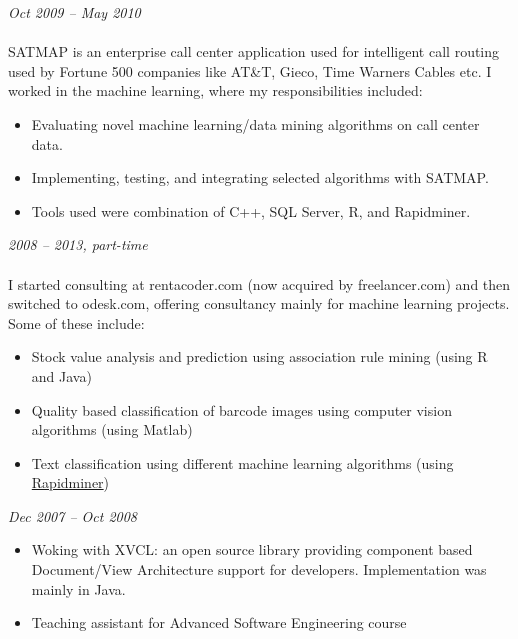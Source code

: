 \documentclass[margin, 10pt]{res} %
\begin{document}
\begin{resume}
{\sl {}} \hfill \textit{Oct 2009 -- May 2010} \\
{\href{http://www.satmapinc.com/}{\color{RubineRed}{SATMAP Inc, Machine Learning Team, Pakistan}}}  \\
SATMAP is an enterprise call center application used for intelligent call routing used by Fortune 500 companies like AT\&T, Gieco, Time Warners Cables etc. I worked in the machine learning, where my responsibilities included:

\begin{itemize} \itemsep -2pt %
\item Evaluating novel machine learning/data mining algorithms on call center data. 
\item Implementing, testing, and integrating selected algorithms with SATMAP. 
\item Tools used were combination of C++, SQL Server, R, and Rapidminer.
\end{itemize}

{\sl \textbf{}} \hfill \textit{2008 -- 2013, part-time} \\
{\color{RubineRed}{Upwork (formerly Odesk)} } \\
I started consulting at rentacoder.com (now acquired by freelancer.com) and then switched to odesk.com, offering consultancy mainly for machine learning projects. Some of these include: 
\begin{itemize} \itemsep -2pt %
\item Stock value analysis and prediction using association rule mining (using R and Java)
\item Quality based classification of barcode images using computer vision algorithms (using Matlab)
\item Text classification using different machine learning algorithms (using \href{https://rapidminer.com/}{Rapidminer}) 
\end{itemize} 

 
{\sl \textbf{}} \hfill \textit{Dec 2007 -- Oct 2008} \\
{\color{RubineRed}{Computer Science Department, LUMS, Pakistan}} 
\begin{itemize} 
\item Woking with XVCL: an open source library providing component based Document/View Architecture support for developers. Implementation was mainly in Java.
\item Teaching assistant for Advanced Software Engineering course
\end{itemize} 


\end{resume}
\end{document}
